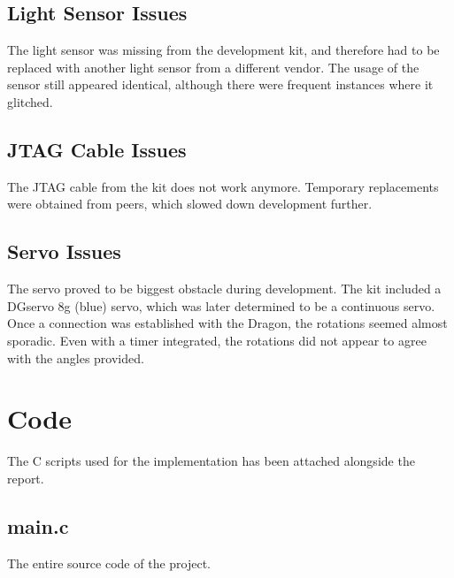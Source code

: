 \documentclass[usletter, 12pt]{article}
\begin{document}
        \subsection{Light Sensor Issues} The light sensor was missing from the
        development kit, and therefore had to be replaced with another light
        sensor from a different vendor. The usage of the sensor still appeared
        identical, although there were frequent instances where it glitched.

        \subsection{JTAG Cable Issues} The JTAG cable from the kit does not
        work anymore. Temporary replacements were obtained from peers, which
        slowed down development further.

        \subsection{Servo Issues} The servo proved to be biggest obstacle
        during development. The kit included a DGservo 8g (blue) servo, which
        was later determined to be a continuous servo. Once a connection was
        established with the Dragon, the rotations seemed almost sporadic. Even
        with a timer integrated, the rotations did not appear to agree with the
        angles provided.

    \section{Code} The C scripts used for the implementation has been attached
    alongside the report.

        \subsection{main.c} The entire source code of the project.
\end{document}
